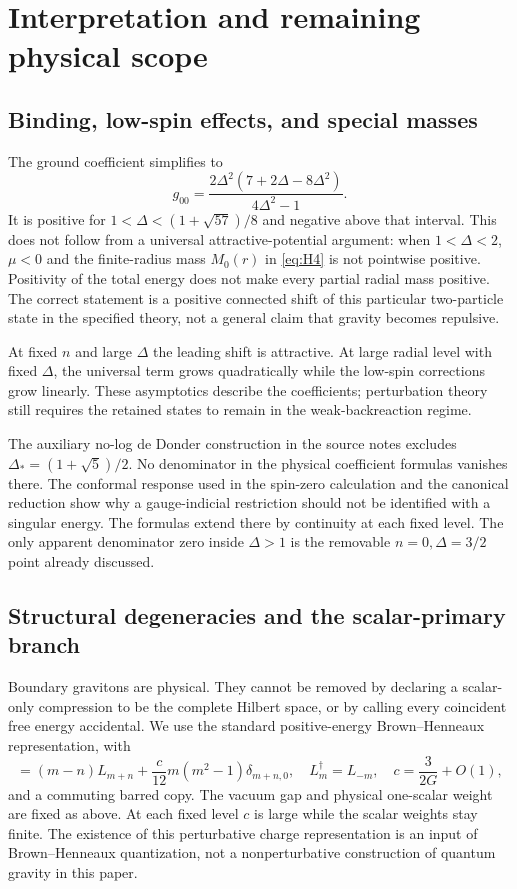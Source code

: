 \documentclass[11pt,a4paper]{article}
\numberwithin{equation}{section}
\theoremstyle{remark}\newtheorem{remark}[theorem]{Remark}
\begin{document}
\section{Interpretation and remaining physical scope}

\subsection{Binding, low-spin effects, and special masses}

The ground coefficient simplifies to
\begin{equation}
 g_{00}=\frac{2\Delta^2(7+2\Delta-8\Delta^2)}{4\Delta^2-1}.
\end{equation}
It is positive for $1<\Delta<(1+\sqrt{57})/8$ and negative above that interval. This does not follow from a universal attractive-potential argument: when $1<\Delta<2$, $\mu<0$ and the finite-radius mass $M_0(r)$ in \eqref{eq:H4} is not pointwise positive. Positivity of the total energy does not make every partial radial mass positive. The correct statement is a positive connected shift of this particular two-particle state in the specified theory, not a general claim that gravity becomes repulsive.

At fixed $n$ and large $\Delta$ the leading shift is attractive. At large radial level with fixed $\Delta$, the universal term grows quadratically while the low-spin corrections grow linearly. These asymptotics describe the coefficients; perturbation theory still requires the retained states to remain in the weak-backreaction regime.

The auxiliary no-log de Donder construction in the source notes excludes
$\Delta_*=(1+\sqrt5)/2$. No denominator in the physical coefficient formulas vanishes there. The conformal response used in the spin-zero calculation and the canonical reduction show why a gauge-indicial restriction should not be identified with a singular energy. The formulas extend there by continuity at each fixed level. The only apparent denominator zero inside $\Delta>1$ is the removable $n=0,\Delta=3/2$ point already discussed.

\subsection{Structural degeneracies and the scalar-primary branch}
\label{sec:branches}

Boundary gravitons are physical. They cannot be removed by declaring a scalar-only compression to be the complete Hilbert space, or by calling every coincident free energy accidental. We use the standard positive-energy Brown--Henneaux representation, with
\begin{equation}
 [L_m,L_n]=(m-n)L_{m+n}+\frac c{12}m(m^2-1)\delta_{m+n,0},
 \quad L_m^\dagger=L_{-m},\quad c=\frac3{2G}+O(1),
\end{equation}
and a commuting barred copy. The vacuum gap and physical one-scalar weight are fixed as above. At each fixed level $c$ is large while the scalar weights stay finite. The existence of this perturbative charge representation is an input of Brown--Henneaux quantization, not a nonperturbative construction of quantum gravity in this paper.
\end{document}
